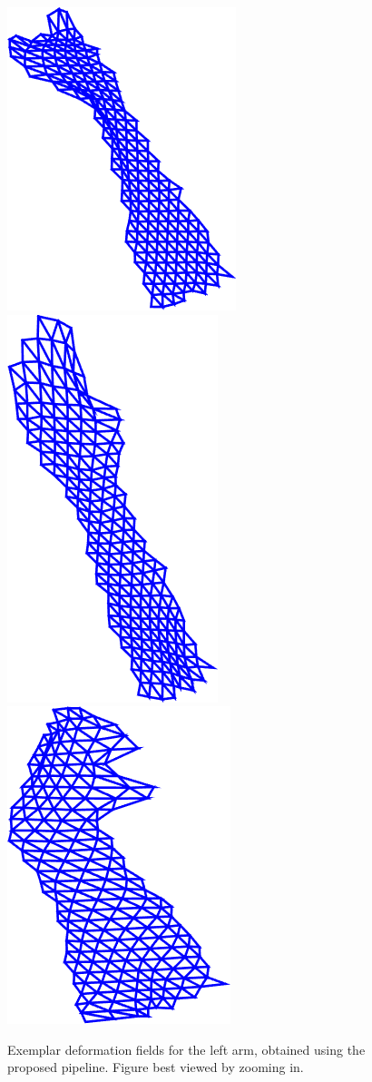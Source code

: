 \begin{figure}[t!]
    \includegraphics[height=\flowh]{resources/Annotation_Correction/Fig_Flows/4}
    \includegraphics[height=\flowh]{resources/Annotation_Correction/Fig_Flows/5}
    \includegraphics[height=\flowh]{resources/Annotation_Correction/Fig_Flows/6}
    \caption{Exemplar deformation fields for the left arm, obtained using the proposed pipeline. Figure best viewed by zooming in.}
    \label{fig:deformationfield}
\end{figure}

